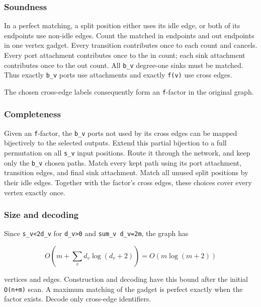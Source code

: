 \hypertarget{af-9f2952a6d0-soundness}{%
\subsubsection{Soundness}\label{af-9f2952a6d0-soundness}}

In a perfect matching, a split position either uses its idle edge, or both of its endpoints use non-idle edges. Count the matched in endpoints and out endpoints in one vertex gadget. Every transition contributes once to each count and cancels. Every port attachment contributes once to the in count; each sink attachment contributes once to the out count. All \texttt{b\_v} degree-one sinks must be matched. Thus exactly \texttt{b\_v} ports use attachments and exactly \texttt{f(v)} use cross edges.

The chosen cross-edge labels consequently form an \texttt{f}-factor in the original graph.

\hypertarget{af-9f2952a6d0-completeness}{%
\subsubsection{Completeness}\label{af-9f2952a6d0-completeness}}

Given an \texttt{f}-factor, the \texttt{b\_v} ports not used by its cross edges can be mapped bijectively to the selected outputs. Extend this partial bijection to a full permutation on all \texttt{s\_v} input positions. Route it through the network, and keep only the \texttt{b\_v} chosen paths. Match every kept path using its port attachment, transition edges, and final sink attachment. Match all unused split positions by their idle edges. Together with the factor's cross edges, these choices cover every vertex exactly once.

\hypertarget{af-9f2952a6d0-size-and-decoding}{%
\subsubsection{Size and decoding}\label{af-9f2952a6d0-size-and-decoding}}

Since \texttt{s\_v\textless{}2d\_v} for \texttt{d\_v\textgreater{}0} and \texttt{sum\_v\ d\_v=2m}, the graph has

\[
O\!\left(m+\sum_v d_v\log(d_v+2)\right)
 =O(m\log(m+2))                                        \tag{2}
\]

vertices and edges. Construction and decoding have this bound after the initial \texttt{O(n+m)} scan. A maximum matching of the gadget is perfect exactly when the factor exists. Decode only cross-edge identifiers.

